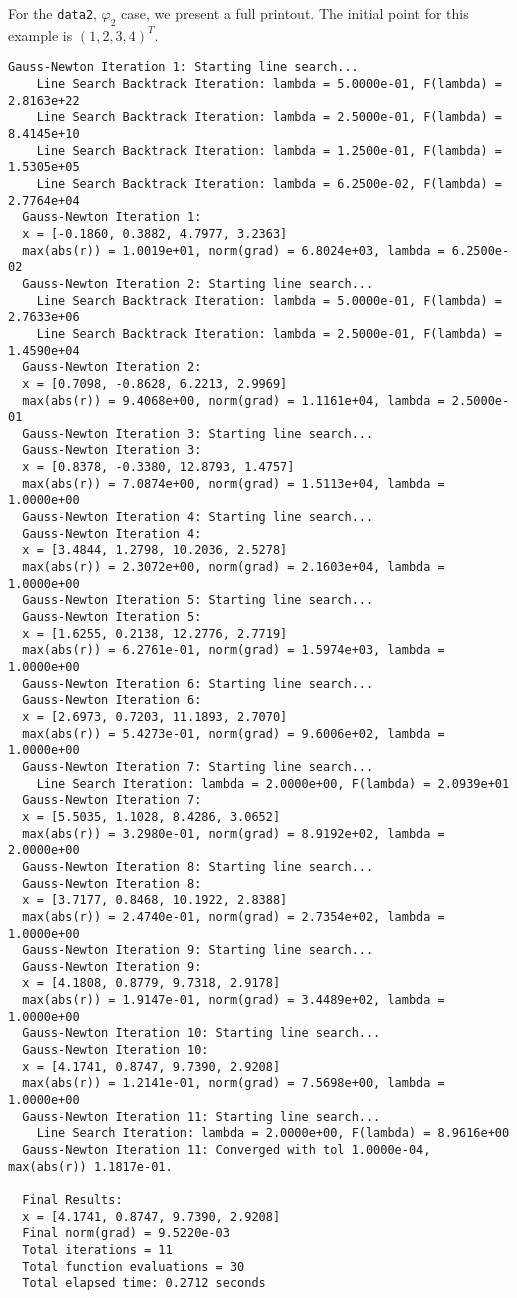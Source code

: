 \documentclass[12pt, a4paper]{article}
\begin{document}
For the \texttt{data2}, $\varphi_2$ case, we present a full printout. The initial point for this example is ${(1,2,3,4)}^T$.
\scriptsize\begin{Verbatim}[frame=single]
  Gauss-Newton Iteration 1: Starting line search...
    Line Search Backtrack Iteration: lambda = 5.0000e-01, F(lambda) = 2.8163e+22
    Line Search Backtrack Iteration: lambda = 2.5000e-01, F(lambda) = 8.4145e+10
    Line Search Backtrack Iteration: lambda = 1.2500e-01, F(lambda) = 1.5305e+05
    Line Search Backtrack Iteration: lambda = 6.2500e-02, F(lambda) = 2.7764e+04
  Gauss-Newton Iteration 1:
  x = [-0.1860, 0.3882, 4.7977, 3.2363]
  max(abs(r)) = 1.0019e+01, norm(grad) = 6.8024e+03, lambda = 6.2500e-02
  Gauss-Newton Iteration 2: Starting line search...
    Line Search Backtrack Iteration: lambda = 5.0000e-01, F(lambda) = 2.7633e+06
    Line Search Backtrack Iteration: lambda = 2.5000e-01, F(lambda) = 1.4590e+04
  Gauss-Newton Iteration 2:
  x = [0.7098, -0.8628, 6.2213, 2.9969]
  max(abs(r)) = 9.4068e+00, norm(grad) = 1.1161e+04, lambda = 2.5000e-01
  Gauss-Newton Iteration 3: Starting line search...
  Gauss-Newton Iteration 3:
  x = [0.8378, -0.3380, 12.8793, 1.4757]
  max(abs(r)) = 7.0874e+00, norm(grad) = 1.5113e+04, lambda = 1.0000e+00
  Gauss-Newton Iteration 4: Starting line search...
  Gauss-Newton Iteration 4:
  x = [3.4844, 1.2798, 10.2036, 2.5278]
  max(abs(r)) = 2.3072e+00, norm(grad) = 2.1603e+04, lambda = 1.0000e+00
  Gauss-Newton Iteration 5: Starting line search...
  Gauss-Newton Iteration 5:
  x = [1.6255, 0.2138, 12.2776, 2.7719]
  max(abs(r)) = 6.2761e-01, norm(grad) = 1.5974e+03, lambda = 1.0000e+00
  Gauss-Newton Iteration 6: Starting line search...
  Gauss-Newton Iteration 6:
  x = [2.6973, 0.7203, 11.1893, 2.7070]
  max(abs(r)) = 5.4273e-01, norm(grad) = 9.6006e+02, lambda = 1.0000e+00
  Gauss-Newton Iteration 7: Starting line search...
    Line Search Iteration: lambda = 2.0000e+00, F(lambda) = 2.0939e+01
  Gauss-Newton Iteration 7:
  x = [5.5035, 1.1028, 8.4286, 3.0652]
  max(abs(r)) = 3.2980e-01, norm(grad) = 8.9192e+02, lambda = 2.0000e+00
  Gauss-Newton Iteration 8: Starting line search...
  Gauss-Newton Iteration 8:
  x = [3.7177, 0.8468, 10.1922, 2.8388]
  max(abs(r)) = 2.4740e-01, norm(grad) = 2.7354e+02, lambda = 1.0000e+00
  Gauss-Newton Iteration 9: Starting line search...
  Gauss-Newton Iteration 9:
  x = [4.1808, 0.8779, 9.7318, 2.9178]
  max(abs(r)) = 1.9147e-01, norm(grad) = 3.4489e+02, lambda = 1.0000e+00
  Gauss-Newton Iteration 10: Starting line search...
  Gauss-Newton Iteration 10:
  x = [4.1741, 0.8747, 9.7390, 2.9208]
  max(abs(r)) = 1.2141e-01, norm(grad) = 7.5698e+00, lambda = 1.0000e+00
  Gauss-Newton Iteration 11: Starting line search...
    Line Search Iteration: lambda = 2.0000e+00, F(lambda) = 8.9616e+00
  Gauss-Newton Iteration 11: Converged with tol 1.0000e-04, max(abs(r)) 1.1817e-01.
  
  Final Results:
  x = [4.1741, 0.8747, 9.7390, 2.9208]
  Final norm(grad) = 9.5220e-03
  Total iterations = 11
  Total function evaluations = 30
  Total elapsed time: 0.2712 seconds
\end{Verbatim}
\end{document}
